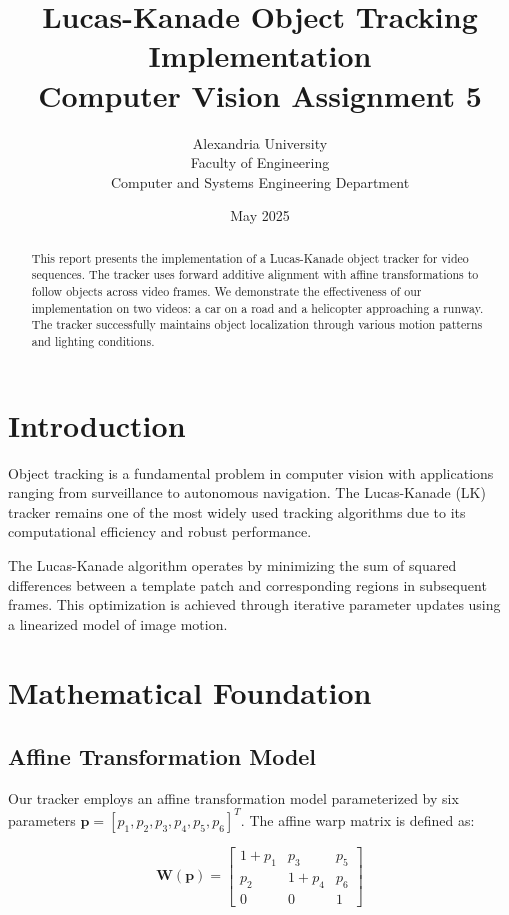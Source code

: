 \documentclass[12pt,a4paper]{article}
\title{Lucas-Kanade Object Tracking Implementation\\
Computer Vision Assignment 5}
\author{Alexandria University\\
Faculty of Engineering\\
Computer and Systems Engineering Department}
\date{May 2025}
\begin{document}
\maketitle

\begin{abstract}
This report presents the implementation of a Lucas-Kanade object tracker for video sequences. The tracker uses forward additive alignment with affine transformations to follow objects across video frames. We demonstrate the effectiveness of our implementation on two videos: a car on a road and a helicopter approaching a runway. The tracker successfully maintains object localization through various motion patterns and lighting conditions.
\end{abstract}

\tableofcontents

\section{Introduction}

Object tracking is a fundamental problem in computer vision with applications ranging from surveillance to autonomous navigation. The Lucas-Kanade (LK) tracker remains one of the most widely used tracking algorithms due to its computational efficiency and robust performance.

The Lucas-Kanade algorithm operates by minimizing the sum of squared differences between a template patch and corresponding regions in subsequent frames. This optimization is achieved through iterative parameter updates using a linearized model of image motion.

\section{Mathematical Foundation}

\subsection{Affine Transformation Model}

Our tracker employs an affine transformation model parameterized by six parameters $\mathbf{p} = [p_1, p_2, p_3, p_4, p_5, p_6]^T$. The affine warp matrix is defined as:

\begin{equation}
\mathbf{W}(\mathbf{p}) = \begin{bmatrix}
1 + p_1 & p_3 & p_5 \\
p_2 & 1 + p_4 & p_6 \\
0 & 0 & 1
\end{bmatrix}
\end{equation}
\end{document}
